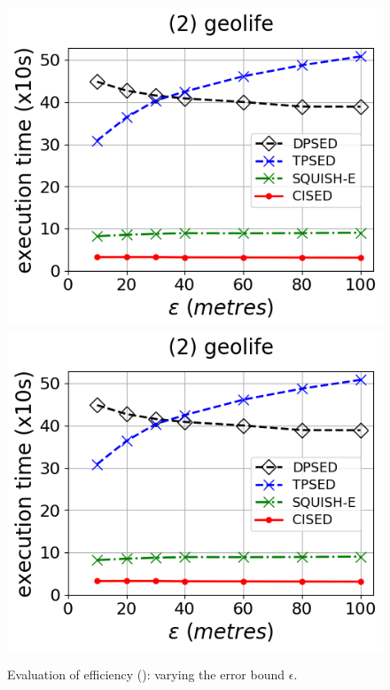 \begin{figure}[tb!]
	\includegraphics[scale=0.315]{Figures/Exp-time-epsilon-geolife.png}	\hspace{1ex}
	\includegraphics[scale=0.315]{Figures/Exp-time-epsilon-geolife.png}	\hspace{1ex}
	\vspace{-2.5ex}
	\caption{\small Evaluation of efficiency (\ped): varying the error bound $\epsilon$.}\label{fig:time-epsilon-ped}
	\vspace{-1ex}
\end{figure}

